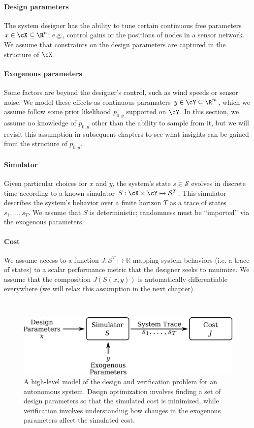 \paragraph{Design parameters} The system designer has the ability to tune certain continuous free parameters $x \in \cX \subseteq \R^n$; e.g., control gains or the positions of nodes in a sensor network. We assume that constraints on the design parameters are captured in the structure of $\cX$.

\paragraph{Exogenous parameters} Some factors are beyond the designer's control, such as wind speeds or sensor noise. We model these effects as continuous paramaters $y \in \cY \subseteq \R^m$, which we assume follow some prior likelihood $p_{0, y}$ supported on $\cY$. In this section, we assume no knowledge of $p_{0, y}$ other than the ability to sample from it, but we will revisit this assumption in subsequent chapters to see what insights can be gained from the structure of $p_{0, y}$.

\paragraph{Simulator} Given particular choices for $x$ and $y$, the system's state $s \in \mathcal{S}$ evolves in discrete time according to a known simulator $S : \cX \times \cY \mapsto \mathcal{S}^T$. This simulator describes the system's behavior over a finite horizon $T$ as a trace of states $s_1, \ldots, s_T$. We assume that $S$ is deterministic; randomness must be ``imported'' via the exogenous parameters.

\paragraph{Cost} We assume access to a function $J: \mathcal{S}^T \mapsto \mathbb{R}$ mapping system behaviors (i.e. a trace of states) to a scalar performance metric that the designer seeks to minimize. We assume that the composition $J(S(x, y))$ is automatically differentiable everywhere (we will relax this assumption in the next chapter).

\ \\

\begin{figure}[tb]
    \centering
    \includegraphics[width=0.6\linewidth]{images/local_methods/block_diagram.png}
    \caption{A high-level model of the design and verification problem for an autonomous system. Design optimization involves finding a set of design parameters so that the simulated cost is minimized, while verification involves understanding how changes in the exogenous parameters affect the simulated cost.}
    \label{local:fig:block_diagram}
\end{figure}

